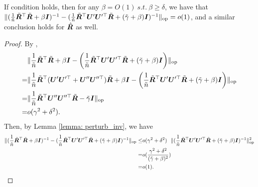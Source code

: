 \begin{lemma}\label{lemma: isotropy_inv}
    If condition \isotropy{} holds, then for any $\beta=O(1)~s.t.~\beta\geq \delta$, we have that $ \lVert (\frac{1}{\tilde{n}}\tilde{{\bm{R}}}^\top \tilde{{\bm{R}}} + \beta {\bm{I}})^{-1}- 
 ( \frac{1}{\tilde{n}}\tilde{{\bm{R}}}^\top{\bm{U}}'{\bm{U}}'^\top\tilde{{\bm{R}}} + (\tilde{\gamma}+\beta){\bm{I}}  )^{-1} \rVert_{\mathrm{op}} =o(1)$, and a similar conclusion holds for $\hat{{\bm{R}}}$ as well.
\end{lemma}
\begin{proof}
By \isotropy{},
    \begin{align}
        \nonumber
       & \lVert  \frac{1}{\tilde{n}}\tilde{{\bm{R}}}^\top \tilde{{\bm{R}}} + \beta {\bm{I}} - \left( \frac{1}{\tilde{n}}\tilde{{\bm{R}}}^\top{\bm{U}}'{\bm{U}}'^\top\tilde{{\bm{R}}} + (\tilde{\gamma}+\beta){\bm{I}}  \right)  \rVert_{\mathrm{op}}\\
        \nonumber
        = & \lVert  \frac{1}{\tilde{n}}\tilde{{\bm{R}}}^\top ({\bm{U}}'{\bm{U}}'^\top+{\bm{U}}''{\bm{U}}''^\top) \tilde{{\bm{R}}} + \beta {\bm{I}} - \left( \frac{1}{\tilde{n}}\tilde{{\bm{R}}}^\top{\bm{U}}'{\bm{U}}'^\top\tilde{{\bm{R}}} + (\tilde{\gamma}+\beta){\bm{I}}  \right)  \rVert_{\mathrm{op}}\\
        \nonumber
        = &  \lVert  \frac{1}{\tilde{n}}\tilde{{\bm{R}}}^\top {\bm{U}}''{\bm{U}}''^\top \tilde{{\bm{R}}} - \tilde{\gamma}{\bm{I}}  \rVert_{\mathrm{op}}\\
        \nonumber
        = & o(\gamma^2+\delta^2). 
    \end{align}
Then, by Lemma \ref{lemma: perturb_inv}, we have
\begin{align}
    \nonumber
    \lVert  (\frac{1}{\tilde{n}}\tilde{{\bm{R}}}^\top \tilde{{\bm{R}}} + \beta {\bm{I}})^{-1}- 
 ( \frac{1}{\tilde{n}}\tilde{{\bm{R}}}^\top{\bm{U}}'{\bm{U}}'^\top\tilde{{\bm{R}}} + (\tilde{\gamma}+\beta){\bm{I}}  )^{-1}  \rVert_{\mathrm{op}} \leq & o(\gamma^2 + \delta^2)~~ \lVert  (\frac{1}{\tilde{n}}\tilde{{\bm{R}}}^\top{\bm{U}}'{\bm{U}}'^\top\tilde{{\bm{R}}} + (\tilde{\gamma}+\beta){\bm{I}}  )^{-1}  \rVert_{\mathrm{op}}^2 \\
 \nonumber
 = & o( \frac{\gamma^2+\delta^2}{ (\tilde{\gamma}+\beta)^2 } )\\
        \nonumber
        = &o(1).
\end{align}
\end{proof}

